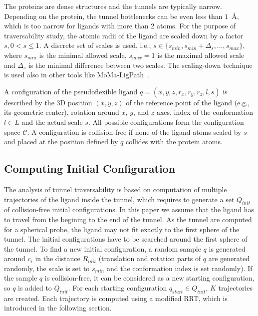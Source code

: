 \documentclass{svmult}
\def\qstart{q_{start}}
\def\qinit{\qstart}
\def\C{\mathcal{C}}
\def\CFD{{\mathcal{C}^s_{free}}}
\def\QI{Q_{init}}
\def\RI{R_{init}}
\def\smin{s_{min}}
\def\smax{s_{max}}
\def\sdelta{{\Delta}_s}
\def\L{L}
\begin{document}

The proteins are dense structures and the tunnels are typically narrow.
Depending on the protein, the tunnel bottlenecks can be even less than $1$~\AA, which is too narrow for ligands with more than 2 atoms.
For the purpose of traversability study, the atomic radii of the ligand are scaled down by a factor $s, 0 < s \le 1$.
A discrete set of scales is used, i.e., $s \in \{\smin, \smin+\sdelta, \ldots, \smax\}$, where 
$\smin$ is the minimal allowed scale, $\smax=1$ is the maximal allowed scale and $\sdelta$ is the minimal difference between two scales.
The scaling-down  technique is used also in other tools like MoMa-LigPath~\cite{cortes2005path}.

A configuration of the pseudoflexible ligand $q=(x,y,z,r_x,r_y,r_z,l,s)$  is described
by the 3D position $(x,y,z)$ of the reference point of the ligand (e.g., its geometric center), rotation around $x$, $y$, and $z$ axes,
index of the conformation $l\in \L$ and the actual scale $s$.
All possible configurations form the configuration space $\C$. 
A configuration is collision-free if none of the ligand atoms scaled by $s$ and placed at the
position defined by $q$ collides with the protein atoms.


\subsection{Computing Initial Configuration}

The analysis of tunnel traversability is based on computation of multiple trajectories of the ligand inside the tunnel, which
requires to generate a set $\QI$ of collision-free initial configurations.
In this paper we assume that the ligand has to travel from the begining to the end of the tunnel.
As the tunnel are computed for a spherical probe, the ligand may not fit exactly to the first sphere of the tunnel.
The initial configurations have to be searched around the first sphere of the tunnel.
To find a new initial configuration, a random sample $q$ is generated around $c_i$ in the distance $\RI$ (translation and rotation
 parts of $q$ are generated randomly, the scale is set to $\smin$ and the conformation index is set randomly).
If the sample $q$ is collision-free, it can be considered as a new starting configuration, so $q$ is added to $\QI$.
For each starting configuration $\qinit \in \QI$,  $K$ trajectories are created.
Each trajectory is computed using a modified RRT, which is introduced in the following section.
\end{document}
